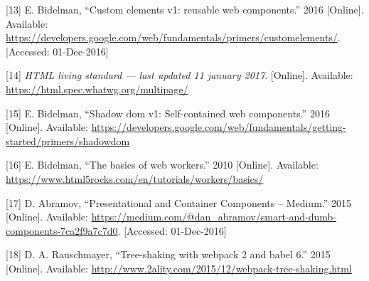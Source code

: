 \documentclass[]{article}
\begin{document}
\hypertarget{ref-Bidelman2016}{}
{[}13{]} E. Bidelman, ``Custom elements v1: reusable web components.''
2016 {[}Online{]}. Available:
\url{https://developers.google.com/web/fundamentals/primers/customelements/}.
{[}Accessed: 01-Dec-2016{]}

\hypertarget{ref-HTML}{}
{[}14{]} \emph{HTML living standard --- last updated 11 january 2017}.
{[}Online{]}. Available: \url{https://html.spec.whatwg.org/multipage/}

\hypertarget{ref-Bidelman2016shadow}{}
{[}15{]} E. Bidelman, ``Shadow dom v1: Self-contained web components.''
2016 {[}Online{]}. Available:
\url{https://developers.google.com/web/fundamentals/getting-started/primers/shadowdom}

\hypertarget{ref-Bidelman2010}{}
{[}16{]} E. Bidelman, ``The basics of web workers.'' 2010 {[}Online{]}.
Available: \url{https://www.html5rocks.com/en/tutorials/workers/basics/}

\hypertarget{ref-Abramov2015}{}
{[}17{]} D. Abramov, ``Presentational and Container Components --
Medium.'' 2015 {[}Online{]}. Available:
\url{https://medium.com/@dan_abramov/smart-and-dumb-components-7ca2f9a7c7d0}.
{[}Accessed: 01-Dec-2016{]}

\hypertarget{ref-Rauschmayer2015}{}
{[}18{]} D. A. Rauschmayer, ``Tree-shaking with webpack 2 and babel 6.''
2015 {[}Online{]}. Available:
\url{http://www.2ality.com/2015/12/webpack-tree-shaking.html}
\end{document}
